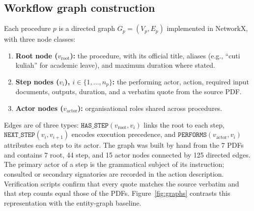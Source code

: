 \documentclass[preprint,10pt]{elsarticle}
\begin{document}
\subsection{Workflow graph construction}
\label{sec:graph}
Each procedure $p$ is a directed graph $G_p=(V_p,E_p)$ implemented in NetworkX, with three node classes:
\begin{enumerate}[leftmargin=*]
\item \textbf{Root node ($v_{\text{root}}$):} the procedure, with its official title, aliases (e.g., ``cuti kuliah'' for academic leave), and maximum duration where stated.
\item \textbf{Step nodes ($v_i$), $i\in\{1,\dots,n_p\}$:} the performing actor, action, required input documents, outputs, duration, and a verbatim quote from the source PDF.
\item \textbf{Actor nodes ($v_{\text{actor}}$):} organisational roles shared across procedures.
\end{enumerate}
Edges are of three types: $\texttt{HAS\_STEP}(v_{\text{root}},v_i)$ links the root to each step, $\texttt{NEXT\_STEP}(v_i,v_{i+1})$ encodes execution precedence, and $\texttt{PERFORMS}(v_{\text{actor}},v_i)$ attributes each step to its actor. The graph was built by hand from the 7 PDFs and contains 7 root, 44 step, and 15 actor nodes connected by 125 directed edges. The primary actor of a step is the grammatical subject of its instruction; consulted or secondary signatories are recorded in the action description. Verification scripts confirm that every quote matches the source verbatim and that step counts equal those of the PDFs. Figure~\ref{fig:graphs} contrasts this representation with the entity-graph baseline.
\end{document}
